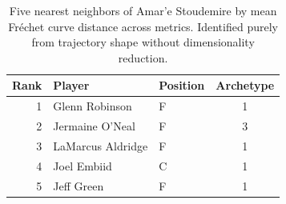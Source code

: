 \begin{table}[htbp]
  \centering\small
  \begin{tabular}{rllc}
    \toprule
    Rank & Player & Position & Archetype \\
    \midrule
    1 & Glenn Robinson & F & 1 \\
    2 & Jermaine O'Neal & F & 3 \\
    3 & LaMarcus Aldridge & F & 1 \\
    4 & Joel Embiid & C & 1 \\
    5 & Jeff Green & F & 1 \\
    \bottomrule
  \end{tabular}
  \caption{Five nearest neighbors of Amar'e Stoudemire by mean Fr\'{e}chet curve distance across metrics. Identified purely from trajectory shape without dimensionality reduction.}
  \label{tab:Amar_e_Stoudemire_frechet_curve_neighbors}
\end{table}

